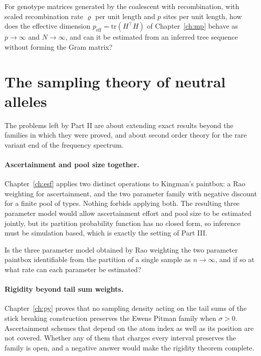 \begin{question}\label{future:q:ld}
For genotype matrices generated by the coalescent with recombination, with scaled recombination
rate $\varrho$ per unit length and $p$ sites per unit length, how does the effective dimension
$p_{\mathrm{eff}}=\mathrm{tr}(H^\top H)$ of Chapter~\ref{ch:mp} behave as $p\to\infty$ and
$N\to\infty$, and can it be estimated from an inferred tree sequence without forming the Gram
matrix?
\end{question}

\section{The sampling theory of neutral alleles}

The problems left by Part II are about extending exact results beyond the families in which they
were proved, and about second order theory for the rare variant end of the frequency spectrum.

\paragraph{Ascertainment and pool size together.} Chapter~\ref{ch:esf} applies two distinct
operations to Kingman's paintbox: a Rao weighting for ascertainment, and the two
parameter family with negative discount for a finite pool of types. Nothing forbids applying both. The resulting three
parameter model would allow ascertainment effort and pool size to be estimated jointly, but its
partition probability function has no closed form, so inference must be simulation based, which is
exactly the setting of Part III.

\begin{question}\label{future:q:three}
Is the three parameter model obtained by Rao weighting the two parameter paintbox identifiable from
the partition of a single sample as $n\to\infty$, and if so at what rate can each parameter be
estimated?
\end{question}

\paragraph{Rigidity beyond tail sum weights.} Chapter~\ref{ch:py} proves that no sampling density
acting on the tail sums of the stick breaking construction preserves the Ewens Pitman family when
$\sigma>0$. Ascertainment schemes that depend on the atom index as well as its position are not
covered. Whether any of them that charges every interval preserves the family is open, and a negative answer would make the
rigidity theorem complete.

